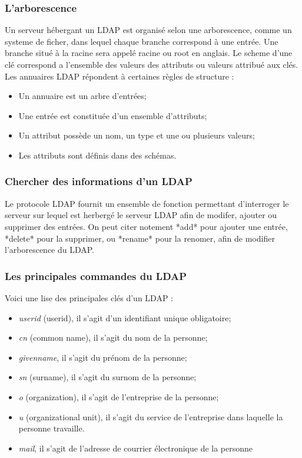 \subsubsection{L'arborescence}

Un serveur hébergant un LDAP est organisé selon une arborescence, comme un systeme de ficher, dans lequel chaque branche correspond à une entrée. Une branche situé à la racine sera appelé racine ou root en anglais. Le scheme d'une clé correspond a l'ensemble des valeurs des attributs ou valeurs attribué aux clés.
Les annuaires LDAP répondent à certaines règles de structure :
\begin{itemize}
    \item Un annuaire est un arbre d'entrées;
    \item Une entrée est constituée d'un ensemble d'attributs;
    \item Un attribut possède un nom, un type et une ou plusieurs valeurs;
    \item Les attributs sont définis dans des schémas.
\end{itemize}


\subsubsection{Chercher des informations d'un LDAP}

Le protocole LDAP fournit un ensemble de fonction permettant d'interroger le serveur sur lequel est herbergé le serveur LDAP afin de modifer, ajouter ou supprimer des entrées. On peut citer notement *add* pour ajouter une entrée, *delete* pour la supprimer, ou *rename* pour la renomer, afin de modifier l'arborescence du LDAP.
\subsubsection{Les principales commandes du LDAP}
Voici une lise des principales clés d'un LDAP :
\begin{itemize}
    \item \textit{userid} (userid), il s'agit d'un identifiant unique obligatoire;
    \item \textit{cn} (common name), il s'agit du nom de la personne;
    \item \textit{givenname}, il s'agit du prénom de la personne;
    \item \textit{sn} (surname), il s'agit du surnom de la personne;
    \item \textit{o} (organization), il s'agit de l'entreprise de la personne;
    \item \textit{u} (organizational unit), il s'agit du service de l'entreprise dans laquelle la personne travaille.
    \item \textit{mail}, il s'agit de l'adresse de courrier électronique de la personne
\end{itemize}

